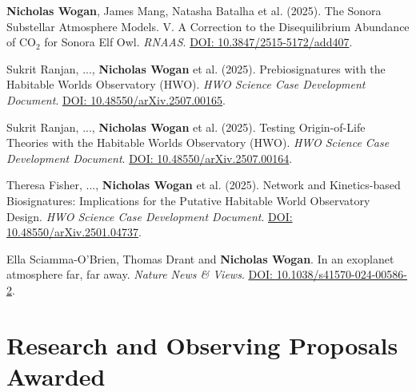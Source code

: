 \documentclass[12pt]{article}
\begin{document}
\begin{cvlist}
\item[2025]
  \textbf{Nicholas Wogan}, James Mang, Natasha Batalha et al. (2025). The Sonora Substellar Atmosphere Models. V. A Correction to the Disequilibrium Abundance of CO$_2$ for Sonora Elf Owl. \emph{RNAAS}. \href{https://doi.org/10.3847/2515-5172/add407}{DOI: 10.3847/2515-5172/add407}.
\item[2025]
  Sukrit Ranjan, ..., \textbf{Nicholas Wogan} et al. (2025). Prebiosignatures with the Habitable Worlds Observatory (HWO). \emph{HWO Science Case Development Document}. \href{https://doi.org/10.48550/arXiv.2507.00165}{DOI: 10.48550/arXiv.2507.00165}.
\item[2025]
  Sukrit Ranjan, ..., \textbf{Nicholas Wogan} et al. (2025). Testing Origin-of-Life Theories with the Habitable Worlds Observatory (HWO). \emph{HWO Science Case Development Document}. \href{https://doi.org/10.48550/arXiv.2507.00164}{DOI: 10.48550/arXiv.2507.00164}.
\item[2025]
  Theresa Fisher, ..., \textbf{Nicholas Wogan} et al. (2025). Network and Kinetics-based Biosignatures: Implications for the Putative Habitable World Observatory Design. \emph{HWO Science Case Development Document}. \href{https://doi.org/10.48550/arXiv.2501.04737}{DOI: 10.48550/arXiv.2501.04737}.
\item[2024]
  Ella Sciamma-O'Brien, Thomas Drant and \textbf{Nicholas Wogan}. In an exoplanet atmosphere far, far away. \emph{Nature News \& Views}. \href{https://doi.org/10.1038/s41570-024-00586-2}{DOI: 10.1038/s41570-024-00586-2}.
\end{cvlist}

\section{Research and Observing Proposals Awarded}
\end{document}
